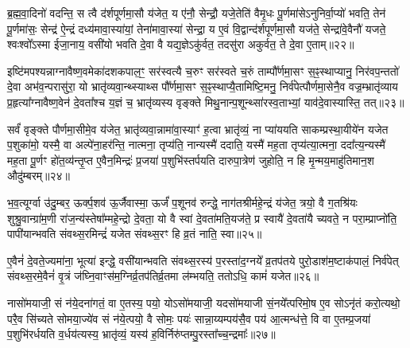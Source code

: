 {}

ब्र॒ह्म॒वा॒दिनो॑ वदन्ति॒ स त्वै द॑र्शपूर्णमा॒सौ य॑जेत॒ य ए॑नौ॒ सेन्द्रौ॒ यजे॒तेति॑ वैमृ॒धः पू॒र्णमा॑से\-ऽनुनिर्वा॒प्यो॑ भवति॒ तेन॑ पू॒र्णमा॑सः॒ सेन्द्र॑ ऐ॒न्द्रं दध्य॑मावा॒स्या॑यां॒ तेना॑मावा॒स्या॑ सेन्द्रा॒ य ए॒वं वि॒द्वान्द॑र्शपूर्णमा॒सौ यज॑ते॒ सेन्द्रा॑वे॒वैनौ॑ यजते॒ श्वःश्वो᳚\-ऽस्मा ईजा॒नाय॒ वसी॑यो भवति दे॒वा वै यद्य॒ज्ञे\-ऽकु॑र्वत॒ तदसु॑रा अकुर्वत॒ ते दे॒वा ए॒ताम्॥२२॥

इष्टि॑मपश्यन्नाग्नावैष्ण॒वमेका॑दशकपाल॒ꣳ॒ सर॑स्वत्यै च॒रुꣳ सर॑स्वते च॒रुं ताम्पौ᳚र्णमा॒सꣳ स॒ꣴ॒स्थाप्यानु॒ निर॑वप॒न्ततो॑ दे॒वा अभ॑व॒न्परासु॑रा॒ यो भ्रातृ॑व्यवा॒न्थ्स्याथ्स पौ᳚र्णमा॒सꣳ स॒ꣴ॒स्थाप्यै॒तामिष्टि॒मनु॒ निर्व॑पेत्पौर्णमा॒सेनै॒व वज्र॒म्भ्रातृ॑व्याय प्र॒हृत्या᳚ग्नावैष्ण॒वेन॑ दे॒वता᳚श्च य॒ज्ञं च॒ भ्रातृ॑व्यस्य वृङ्क्ते मिथु॒नान्प॒शून्थ्सा॑रस्व॒ताभ्यां॒ याव॑दे॒वास्यास्ति॒ तत्॥२३॥

सर्वं॑ वृङ्क्ते पौर्णमा॒सीमे॒व य॑जेत॒ भ्रातृ॑व्यवा॒न्नामा॑वा॒स्याꣳ॑ ह॒त्वा भ्रातृ॑व्यं॒ ना प्या॑ययति साकम्प्रस्था॒यीये॑न यजेत प॒शुका॑मो॒ यस्मै॒ वा अल्पे॑ना॒हर॑न्ति॒ नात्मना॒ तृप्य॑ति॒ नान्यस्मै॑ ददाति॒ यस्मै॑ मह॒ता तृप्य॑त्या॒त्मना॒ ददा᳚त्य॒न्यस्मै॑ मह॒ता पू॒र्णꣳ हो॑त॒व्य॑न्तृ॒प्त ए॒वैन॒मिन्द्रः॑ प्र॒जया॑ प॒शुभि॑स्तर्पयति दारुपा॒त्रेण॑ जुहोति॒ न हि मृ॒न्मय॒माहु॑तिमान॒श औदु॑म्बरम्॥२४॥

भ॒व॒त्यूर्ग्वा उ॑दु॒म्बर॒ ऊर्क्प॒शव॑ ऊ॒र्जैवास्मा॒ ऊर्जं॑ प॒शूनव॑ रुन्द्धे॒ नाग॑तश्रीर्महे॒न्द्रं य॑जेत॒ त्रयो॒ वै ग॒तश्रि॑यः शुश्रु॒वान्ग्रा॑म॒णी रा॑ज॒न्य॑स्तेषा᳚म्महे॒न्द्रो दे॒वता॒ यो वै स्वां दे॒वता॑मति॒यज॑ते॒ प्र स्वायै॑ दे॒वता॑यै च्यवते॒ न परा॒म्प्राप्नो॑ति॒ पापी॑यान्भवति संवथ्स॒रमिन्द्रं॑ यजेत संवथ्स॒रꣳ हि व्र॒तं नाति॒ स्वा॥२५॥

ए॒वैनं॑ दे॒वते॒ज्यमा॑ना॒ भूत्या॑ इन्द्धे॒ वसी॑यान्भवति संवथ्स॒रस्य॑ प॒रस्ता॑द॒ग्नये᳚ व्र॒तप॑तये पुरो॒डाश॑म॒ष्टाक॑पालं॒ निर्व॑पेत् संवथ्स॒रमे॒वैनं॑ वृ॒त्रं ज॑घ्नि॒वाꣳस॑म॒ग्निर्व्र॒तप॑तिर्व्र॒तमा ल॑म्भयति॒ ततो\-ऽधि॒ कामं॑ यजेत॥२६॥

{\anuvakamend[{ए॒तान्तदौदु॑म्बर॒ꣴ॒ स्वा त्रि॒ꣳ॒शच्च॑॥४॥}]}

नासो॑मयाजी॒ सं न॑ये॒दना॑गतं॒ वा ए॒तस्य॒ पयो॒ यो\-ऽसो॑मयाजी॒ यदसो॑मयाजी सं॒नये᳚त्परिमो॒ष ए॒व सो\-ऽनृ॑तं करो॒त्यथो॒ परै॒व सि॑च्यते सोमया॒ज्ये॑व सं न॑ये॒त्पयो॒ वै सोमः॒ पयः॑ सान्ना॒य्यम्पय॑सै॒व पय॑ आ॒त्मन्ध॑त्ते॒ वि वा ए॒तम्प्र॒जया॑ प॒शुभि॑रर्धयति व॒र्धय॑त्यस्य॒ भ्रातृ॑व्यं॒ यस्य॑ ह॒विर्निरु॑प्तम्पु॒रस्ता᳚च्च॒न्द्रमाः᳚॥२७॥

